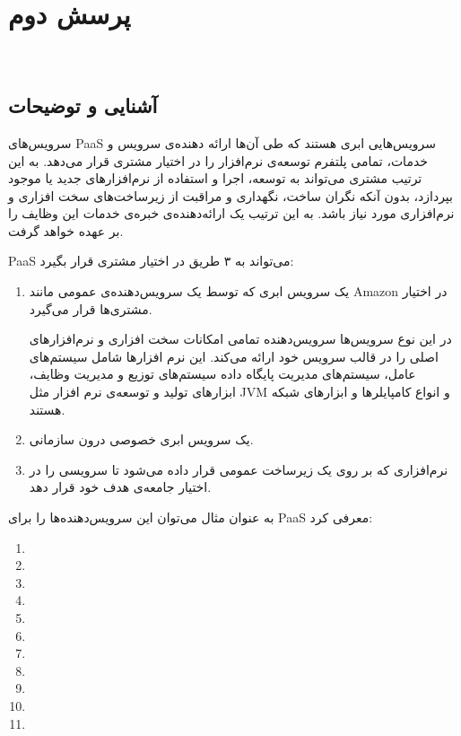 
\section{پرسش دوم}\ \\

\subsection{آشنایی و توضیحات}

سرویس‌های PaaS 
سرویس‌هایی ابری هستند که طی آن‌ها ارائه‌ دهنده‌ی سرویس و خدمات، تمامی پلتفرم توسعه‌ی نرم‌افزار را در اختیار مشتری قرار می‌دهد. به این ترتیب مشتری می‌تواند به توسعه‌، اجرا و استفاده از نرم‌افزار‌های جدید یا موجود بپردازد، بدون آنکه نگران ساخت، نگهداری و مراقبت از زیر‌ساخت‌های سخت افزاری و نرم‌افزاری مورد نیاز باشد. به این ترتیب یک ارائه‌دهنده‌ی خبره‌ی خدمات این وظایف را بر عهده خواهد گرفت.

PaaS می‌تواند به ۳ طریق در اختیار مشتری قرار بگیرد:
\begin{enumerate}
\item
 یک سرویس ابری که توسط یک سرویس‌دهنده‌ی عمومی مانند Amazon در اختیار مشتری‌ها قرار می‌گیرد.
 
 در این نوع سرویس‌ها سرویس‌دهنده تمامی امکانات سخت افزاری و نرم‌افزار‌های اصلی را در قالب سرویس خود ارائه می‌کند. این نرم افزار‌ها شامل سیستم‌های عامل، سیستم‌های مدیریت پایگاه داده
 سیستم‌های توزیع و مدیریت وظایف، ابزار‌های تولید و توسعه‌ی نرم افزار مثل JVM و انواع کامپایلر‌ها و ابزار‌های شبکه هستند.
 
\item
یک سرویس ابری خصوصی درون سازمانی.
\item
نرم‌افزاری که بر روی یک زیرساخت عمومی قرار داده می‌شود تا سرویسی را در اختیار جامعه‌ی هدف خود قرار دهد.
\cite{PaaS-Wikipedia}

\end{enumerate}
به عنوان مثال می‌توان این سرویس‌دهنده‌ها را برای PaaS معرفی کرد:
\begin{enumerate}
\item {}
\item {}
\item {}
\item {}
\item {}
\item {}
\item {}
\item {}
\item {}
\item {}
\item 
\end{enumerate}

